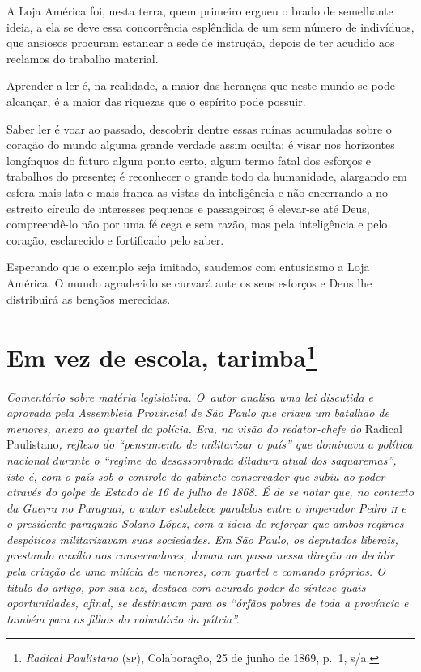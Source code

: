 A Loja América foi, nesta terra, quem primeiro ergueu o brado de
semelhante ideia, a ela se deve essa concorrência esplêndida de um sem
número de indivíduos, que ansiosos procuram estancar a sede de
instrução, depois de ter acudido aos reclamos do trabalho material.

Aprender a ler é, na realidade, a maior das heranças que neste mundo se
pode alcançar, é a maior das riquezas que o espírito pode possuir.

Saber ler é voar ao passado, descobrir dentre essas ruínas acumuladas
sobre o coração do mundo alguma grande verdade assim oculta; é visar nos
horizontes longínquos do futuro algum ponto certo, algum termo fatal dos
esforços e trabalhos do presente; é reconhecer o grande todo da
humanidade, alargando em esfera mais lata e mais franca as vistas da
inteligência e não encerrando-a no estreito círculo de interesses
pequenos e passageiros; é elevar-se até Deus, compreendê-lo não por uma
fé cega e sem razão, mas pela inteligência e pelo coração, esclarecido e
fortificado pelo saber.

Esperando que o exemplo seja imitado, saudemos com entusiasmo a Loja
América. O mundo agradecido se curvará ante os seus esforços e Deus lhe
distribuirá as bençãos merecidas.

\chapter{Em vez de escola, tarimba\footnote{\emph{Radical Paulistano}
  (\textsc{sp}), Colaboração, 25 de junho de 1869, p.~1, s/a.}}

\begin{didascalia}
\emph{Comentário sobre matéria legislativa. O~autor analisa uma lei discutida
e aprovada pela Assembleia Provincial de São Paulo que criava um
batalhão de menores, anexo ao quartel da polícia. Era, na visão do
redator-chefe do} Radical Paulistano\emph{, reflexo do ``pensamento de
militarizar o país'' que dominava a política nacional durante o ``regime
da desassombrada ditadura atual dos saquaremas'', isto é, com o país sob
o controle do gabinete conservador que subiu ao poder através do golpe
de Estado de 16 de julho de 1868. É de se notar que, no contexto da
Guerra no Paraguai, o autor estabelece paralelos entre o imperador Pedro
\textsc{ii} e o presidente paraguaio Solano López, com a ideia de reforçar que
ambos regimes despóticos militarizavam suas sociedades. Em São Paulo, os
deputados liberais, prestando auxílio aos conservadores, davam um passo
nessa direção ao decidir pela criação de uma milícia de menores, com
quartel e comando próprios. O título do artigo, por sua vez, destaca com
acurado poder de síntese quais oportunidades, afinal, se destinavam para
os ``órfãos pobres de toda a província e também para os filhos do
voluntário da pátria''.}
\end{didascalia}

